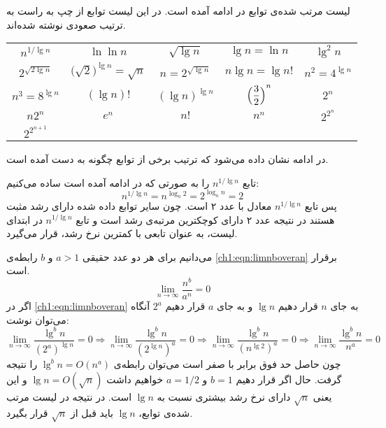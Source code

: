 
لیست مرتب ‌شده‌ی توابع در ادامه آمده است. در این لیست توابع از چپ به راست به ترتیب صعودی نوشته شده‌اند.
\begin{center}
\begin{LTR}
\begin{tabular}{ccccc}
$n^{1/\lg n}$ & $\ln \ln n$ & $\sqrt{\lg n}$ & $\lg n = \ln n$ & ${\lg}^2 n$\\[0.4cm]
$2^{\sqrt{2\lg n}}$ & ${\bigl(\sqrt{2}\bigr)}^{\lg n} = \sqrt{n}$ & $n = 2^{\sqrt{\lg n}}$ & $n\lg n = \lg n!$ & $n^2 = 4^{\lg n}$\\[0.4cm]
$n^{3} = 8^{\lg n}$ & $(\lg n)!$ & ${(\lg n)}^{\lg n}$ & ${\Bigl( \dfrac{3}{2}\Bigr) }^n$ & $2^n$\\[0.4cm]
$n2^n$ & $e^n$ & $n!$ & $n^n$ & $2^{2^n}$\\[0.4cm]
$2^{2^{n+1}}$
\end{tabular}
\end{LTR}
\end{center}
در ادامه نشان داده می‌شود که ترتیب برخی از توابع چگونه به دست آمده‌‌ است.

 تابع {$n^{1/\lg n}$} را به صورتی که در ادامه آمده است ساده می‌کنیم:
\begin{displaymath}
n^{1/\lg n}=n^{\log_n{2}}=2^{\log_n{n}}=2
\end{displaymath}
پس تابع {$n^{1/\lg n}$} معادل با عدد ۲ است. چون سایر توابع داده شده دارای رشد مثبت هستند در نتیجه عدد ۲ دارای کوچکترین مرتبه‌ی رشد است و تابع {$n^{1/\lg n}$} در ابتدای لیست، به عنوان تابعی با کمترین نرخ رشد، قرار می‌گیرد.

 می‌دانیم برای هر دو عدد حقیقی {$a>1$} و {$b$} رابطه‌ی {\eqref{ch1:eqn:limnboveran}} برقرار است.
\begin{equation}
\lim_{n\to \infty}{\frac{n^b}{a^n}}=0\label{ch1:eqn:limnboveran}
\end{equation}
 اگر در {\eqref{ch1:eqn:limnboveran}} به جای {$n$} قرار دهیم {$\lg n$} و به جای {$a$} قرار دهیم {$2^a$} آنگاه می‌توان نوشت:
\begin{displaymath}
\lim_{n\to \infty}{\dfrac{{\lg}^b n}{{(2^a)}^{\lg n}}}=0\Rightarrow\lim_{n\to \infty}{\dfrac{{\lg}^b n}{{(2^{\lg n})}^a}}=0\Rightarrow\lim_{n\to \infty}{\dfrac{{\lg}^b n}{{(n^{\lg 2})}^a}}=0\Rightarrow\lim_{n\to \infty}{\dfrac{{\lg}^b n}{n^a}}=0
\end{displaymath}
چون حاصل حد فوق برابر با صفر است می‌توان رابطه‌ی {${\lg}^b n=O(n^a)$} را نتیجه گرفت. حال اگر قرار دهیم {$b=1$} و {$a=1/2$}  خواهیم داشت {$\lg n = O(\sqrt{n})$} و این یعنی {$\sqrt{n}$} دارای نرخ رشد بیشتری نسبت به {$\lg n$} است. در نتیجه در لیست مرتب شده‌ی توابع، {$\lg n$} باید قبل از {$\sqrt{n}$} قرار بگیرد.


